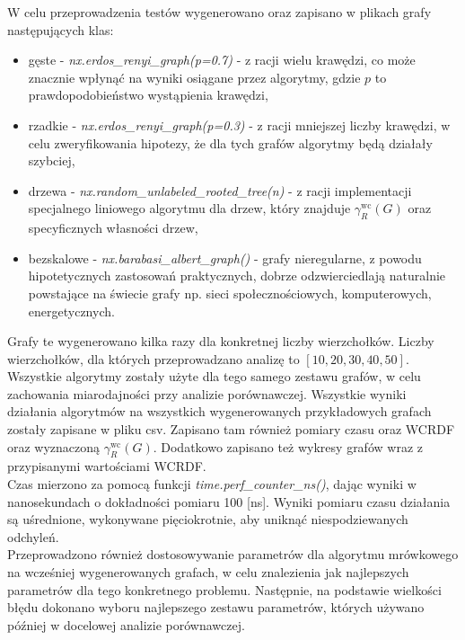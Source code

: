 W celu przeprowadzenia testów wygenerowano oraz zapisano w plikach grafy następujących klas: 
\begin{itemize}
    \item gęste - \textit{nx.erdos\_renyi\_graph(p=0.7)} - z racji wielu krawędzi, co może znacznie wpłynąć na wyniki osiągane przez algorytmy, gdzie $p$ to prawdopodobieństwo wystąpienia krawędzi,
    \item rzadkie - \textit{nx.erdos\_renyi\_graph(p=0.3)} - z racji mniejszej liczby krawędzi, w celu zweryfikowania hipotezy, że dla tych grafów algorytmy będą działały szybciej,
    \item drzewa - \textit{nx.random\_unlabeled\_rooted\_tree(n)} - z racji implementacji specjalnego liniowego algorytmu dla drzew, który znajduje $\gamma_{R}^{\text{wc}}(G)$ oraz specyficznych własności drzew,
    \item bezskalowe - \textit{nx.barabasi\_albert\_graph()} - grafy nieregularne, z powodu hipotetycznych zastosowań praktycznych, dobrze odzwierciedlają naturalnie powstające na świecie grafy np. sieci społecznościowych, komputerowych, energetycznych.
\end{itemize}

Grafy te wygenerowano kilka razy dla konkretnej liczby wierzchołków. Liczby wierzchołków, dla których przeprowadzano analizę to $[10, 20, 30, 40, 50]$. Wszystkie algorytmy zostały użyte dla tego samego zestawu grafów, w celu zachowania miarodajności przy analizie porównawczej. Wszystkie wyniki działania algorytmów na wszystkich wygenerowanych przykładowych grafach zostały zapisane w pliku csv. Zapisano tam również pomiary czasu oraz WCRDF oraz wyznaczoną $\gamma_{R}^{\text{wc}}(G)$. Dodatkowo zapisano też wykresy grafów wraz z przypisanymi wartościami WCRDF.\\

Czas mierzono za pomocą funkcji \textit{time.perf\_counter\_ns()}, dając wyniki w nanosekundach o dokładności pomiaru 100 [ns]. Wyniki pomiaru czasu działania są uśrednione, wykonywane pięciokrotnie, aby uniknąć niespodziewanych odchyleń.\\

Przeprowadzono również dostosowywanie parametrów dla algorytmu mrówkowego na wcześniej wygenerowanych grafach, w celu znalezienia jak najlepszych parametrów dla tego konkretnego problemu. Następnie, na podstawie wielkości błędu dokonano wyboru najlepszego zestawu parametrów, których używano później w docelowej analizie porównawczej.\\

